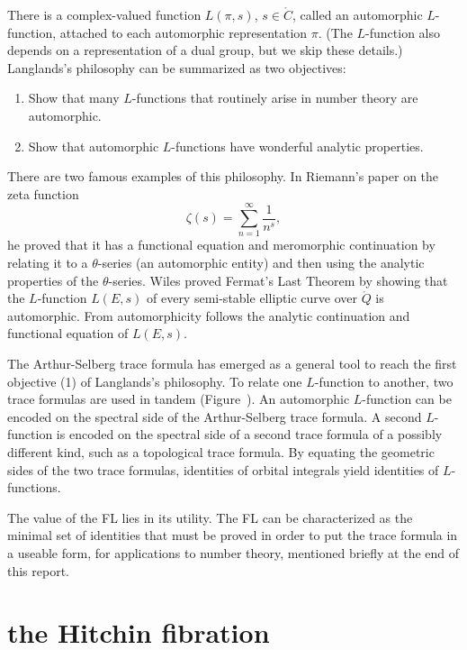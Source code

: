 There is a complex-valued
function $L(\pi,s)$, $s\in \ring{C}$, called an automorphic $L$-function,
attached to each automorphic representation $\pi$. (The $L$-function
also depends on a representation of a dual group, but we skip these details.)
Langlands's philosophy can be summarized as two objectives:
\begin{enumerate}
\item Show that many $L$-functions that routinely arise in
number theory are automorphic.
\item Show that automorphic $L$-functions have wonderful analytic properties. 
\end{enumerate}

There are two famous examples of this philosophy.  
In Riemann's  paper on the zeta function
\[
\zeta(s) = \sum_{n=1}^\infty \frac{1}{n^s},
\]
he proved that it has a functional equation and meromorphic
continuation by relating it to a $\theta$-series (an automorphic
entity) and then using the analytic properties of the $\theta$-series.
Wiles proved Fermat's Last Theorem by showing that the $L$-function
$L(E,s)$ of every semi-stable elliptic curve over $\ring{Q}$ is
automorphic.  From automorphicity follows the analytic continuation
and functional equation of $L(E,s)$.

The Arthur-Selberg trace formula has emerged as a general tool to
reach the first objective (1) of Langlands's philosophy.  To relate
one $L$-function to another, two trace formulas are used in tandem
(Figure~\XX).  An automorphic $L$-function can be encoded on the
spectral side of the Arthur-Selberg trace formula.  A second
$L$-function is encoded on the spectral side of a second trace
formula of a possibly different kind, such as
a topological trace formula.  By equating the geometric sides of the
two trace formulas, identities of orbital integrals yield identities
of $L$-functions.

The value of the FL lies in its utility.  The FL can be characterized
as the minimal set of identities that must be proved in order to put
the trace formula in a useable form, for applications to number theory,
mentioned briefly at the end of this report.

\section{the Hitchin fibration}


